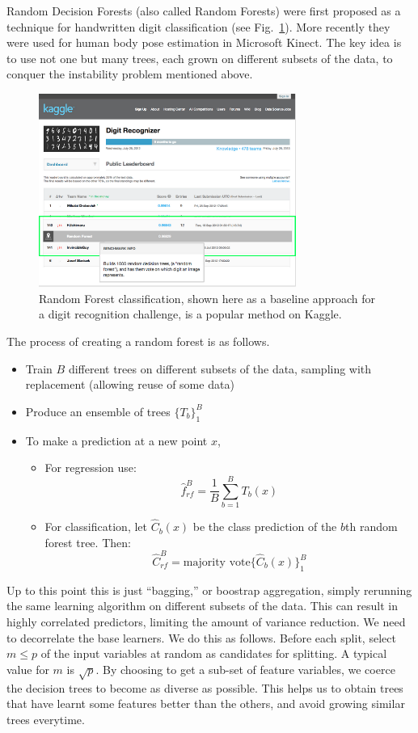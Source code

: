 \documentclass[a4paper]{article}
\begin{document}
Random Decision Forests (also called Random Forests) were first proposed as a technique for handwritten digit classification (see Fig.~\ref{fig:randomforest}).  More recently they were used for human body pose estimation in Microsoft Kinect.  The key idea is to use not one but many trees, each grown on different subsets of the data, to conquer the instability problem mentioned above.

\begin{figure}
\centering
\includegraphics[width=0.75\textwidth]{RandomForests.png}
\caption{\label{fig:randomforest}Random Forest classification, shown here as a baseline approach for a digit recognition challenge, is a popular method on Kaggle.}
\end{figure}


The process of creating a random forest is as follows.
\begin{itemize}
\item Train $B$ different trees on different subsets of the data, sampling with replacement (allowing reuse of some data)
\item Produce an ensemble of trees $\{T_b\}_1^B$
\item To make a prediction at a new point $x$, 
\begin{itemize}
\item For regression use: $${\hat f}_{rf}^B=\frac{1}{B}\sum_{b=1}^B T_b(x)$$
\item For classification, let ${\hat C}_{b}(x)$ be the class prediction of the $b$th random forest tree. Then:
$${\hat C}_{rf}^B=\text{majority vote}\{{\hat C}_b(x)\}_1^B$$
\end{itemize}
\end{itemize}

Up to this point this is just ``bagging,'' or boostrap aggregation, simply rerunning the same learning algorithm on different subsets of the data.  This can result in highly correlated predictors, limiting the amount of variance reduction. We need to decorrelate the base learners.  We do this as follows. Before each split, select $m\leq p$ of the input variables at random as candidates for splitting.  A typical value for $m$ is $\sqrt p$. By choosing to get a sub-set of feature variables, we coerce the decision trees to become as diverse as possible. This helps us to obtain trees that have learnt some features better than the others, and avoid growing similar trees everytime.
\end{document}
